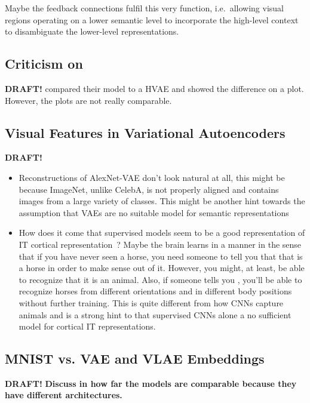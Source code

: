 \documentclass[11pt]{article}
\begin{document}
Maybe the feedback connections fulfil this very function, i.e.\ allowing visual regions operating on a lower semantic level to incorporate the high-level context to disambiguate the lower-level representations.

\subsection{Criticism on \citet{zhao2017learning}}\label{subseq:criticism_vlae}
\textbf{DRAFT!}
\citet{zhao2017learning} compared their model to a HVAE and showed the difference on a plot.
However, the plots are not really comparable.


\subsection{Visual Features in Variational Autoencoders}\label{subsec:discussion_visual_features_in_variational_autoencoders}
\textbf{DRAFT!}
\begin{itemize}
\item Reconstructions of AlexNet-VAE don't look natural at all, this might be because ImageNet, unlike CelebA, is not properly aligned and contains images from a large variety of classes.
This might be another hint towards the assumption that \acp{VAE} are no suitable model for semantic representations
\item How does it come that supervised models seem to be a good representation of \ac{IT} cortical representation~\citep{khaligh2014deep}? Maybe the brain learns in a  manner in the sense that if you have never seen a horse, you need someone to tell you that that is a horse in order to make sense out of it.
However, you might, at least, be able to recognize that it is an animal.
Also, if someone tells you , you'll be able to recognize horses from different orientations and in different body positions without further training.
This is quite different from how \acp{CNN} capture animals and is a strong hint to that supervised \acp{CNN} alone a no sufficient model for cortical IT representations.
\end{itemize}

\subsection{MNIST vs. VAE and VLAE Embeddings}
\textbf{DRAFT!}
\textbf{Discuss in how far the models are comparable because they have different architectures.}
\end{document}
